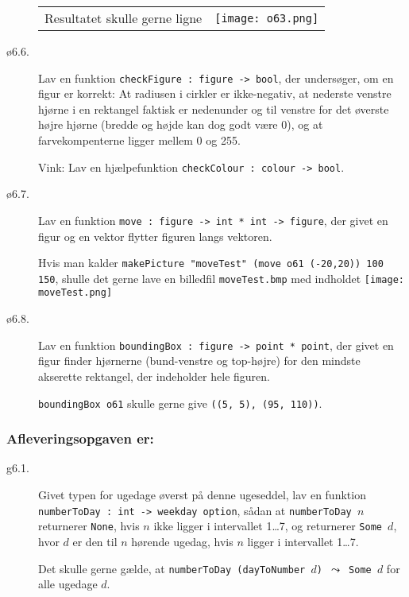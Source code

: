 \documentclass[a4paper]{article}
\begin{document}
\begin{description}
\begin{tabular}{ll}
Resultatet skulle gerne ligne & \texttt{[image: o63.png]}
\end{tabular}



\item[ø6.6.] Lav en funktion \texttt{checkFigure : figure -> bool},
  der undersøger, om en figur er korrekt: At radiusen i cirkler
  er ikke-negativ, at nederste venstre hjørne i en rektangel faktisk
  er nedenunder og til venstre for det øverste højre hjørne (bredde og
  højde kan dog godt være 0), og at farvekompenterne ligger mellem 0
  og 255.

  Vink: Lav en hjælpefunktion \texttt{checkColour : colour -> bool}.

\item[ø6.7.] Lav en funktion \texttt{move : figure -> int * int ->
  figure}, der givet en figur og en vektor flytter figuren langs
  vektoren.

  Hvis man kalder \texttt{makePicture "moveTest" (move o61 (-20,20))
    100 150}, shulle det gerne lave en billedfil \texttt{moveTest.bmp}
  med indholdet
\texttt{[image: moveTest.png]}

\item[ø6.8.] Lav en funktion \texttt{boundingBox : figure -> point *
  point}, der givet en figur finder hjørnerne (bund-venstre og
  top-højre) for den mindste akserette rektangel, der indeholder hele
  figuren.

  \texttt{boundingBox o61} skulle gerne give \texttt{((5, 5), (95,
    110))}.

\end{description}

\newpage
\subsubsection*{Afleveringsopgaven er:}

\begin{description}

\item[g6.1.] Givet typen for ugedage øverst på denne ugeseddel, lav en
  funktion \texttt{numberToDay : int -> weekday option}, sådan at
  \texttt{numberToDay $n$} returnerer \texttt{None}, hvis $n$ ikke
  ligger i intervallet 1\ldots7, og returnerer \texttt{Some $d$}, hvor
  $d$ er den til $n$ hørende ugedag, hvis $n$ ligger i intervallet
  1\ldots7.

  Det skulle gerne gælde, at \texttt{numberToDay (dayToNumber $d$)
    $\leadsto$ Some $d$} for alle ugedage $d$.

\end{description}
\end{document}

